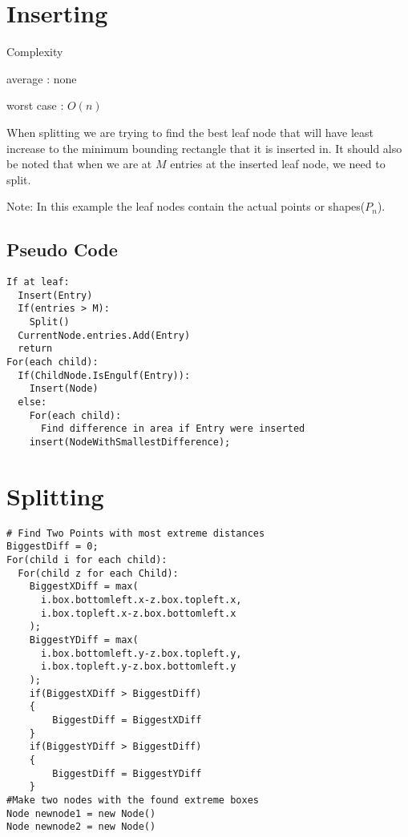 \documentclass{article}
\begin{document}
\begin{multicols}{2}[]
\section{Inserting}
Complexity

average : none

worst case : $O(n)$

When splitting we are trying to find the best leaf node
that will have least increase to the minimum bounding rectangle that it is inserted in.
It should also be noted that when we are at $M$ entries at the inserted leaf node, we
need to split.

\begin{minipage}{\linewidth}
\centering
{}

Note: In this example the leaf nodes contain the actual points or shapes($P_n$).
\end{minipage}

\subsection*{Pseudo Code}

\begin{lstlisting}    
If at leaf:
  Insert(Entry)
  If(entries > M):
    Split()
  CurrentNode.entries.Add(Entry)
  return
For(each child):
  If(ChildNode.IsEngulf(Entry)):
    Insert(Node)
  else:
    For(each child):
      Find difference in area if Entry were inserted
    insert(NodeWithSmallestDifference);
\end{lstlisting}


\section{Splitting} 
\begin{lstlisting}
# Find Two Points with most extreme distances
BiggestDiff = 0;
For(child i for each child):
  For(child z for each Child):
    BiggestXDiff = max(
      i.box.bottomleft.x-z.box.topleft.x,
      i.box.topleft.x-z.box.bottomleft.x
    );
    BiggestYDiff = max(
      i.box.bottomleft.y-z.box.topleft.y,
      i.box.topleft.y-z.box.bottomleft.y
    );
    if(BiggestXDiff > BiggestDiff)
    {
        BiggestDiff = BiggestXDiff
    }
    if(BiggestYDiff > BiggestDiff)
    {
        BiggestDiff = BiggestYDiff
    }
#Make two nodes with the found extreme boxes
Node newnode1 = new Node()
Node newnode2 = new Node()


\end{lstlisting}
\end{multicols}
\end{document}
